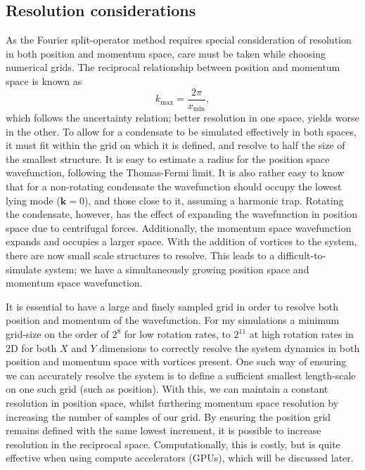 \subsection{Resolution considerations}
As the Fourier split-operator method requires special consideration of resolution in both position and momentum space, care must be taken while choosing numerical grids. The reciprocal relationship between position and momentum space is known as \begin{equation}
    k_{\text{max}} = \frac{2\pi}{x_{\text{min}}},
\end{equation}
which follows the uncertainty relation; better resolution in one space, yields worse in the other. To allow for a condensate to be simulated effectively in both spaces, it must fit within the grid on which it is defined, and resolve to half the size of the smallest structure. It is easy to estimate a radius for the position space wavefunction, following the Thomas-Fermi limit. It is also rather easy to know that for a non-rotating condensate the wavefunction should occupy the lowest lying mode ($\mathbf{k}=0$), and those close to it, assuming a harmonic trap. Rotating the condensate, however, has the effect of expanding the wavefunction in position space due to centrifugal forces. Additionally, the momentum space wavefunction expands and occupies a larger space. With the addition of vortices to the system, there are now small scale structures to resolve. This leads to a difficult-to-simulate system; we have a simultaneously growing position space and momentum space wavefunction.

It is essential to have a large and finely sampled grid in order to resolve both position and momentum of the wavefunction. For my simulations a minimum grid-size on the order of $2^8$ for low rotation rates, to $2^{11}$ at high rotation rates in 2D for both $X$ and $Y$ dimensions to correctly resolve the system dynamics in both position and momentum space with vortices present. One such way of ensuring we can accurately resolve the system is to define a sufficient smallest length-scale on one such grid (such as position). With this, we can maintain a constant resolution in position space, whilst furthering momentum space resolution by increasing the number of samples of our grid. By ensuring the position grid remains defined with the same lowest increment, it is possible to increase resolution in the reciprocal space. Computationally, this is costly, but is quite effective when using compute accelerators (GPUs), which will be discussed later. %
